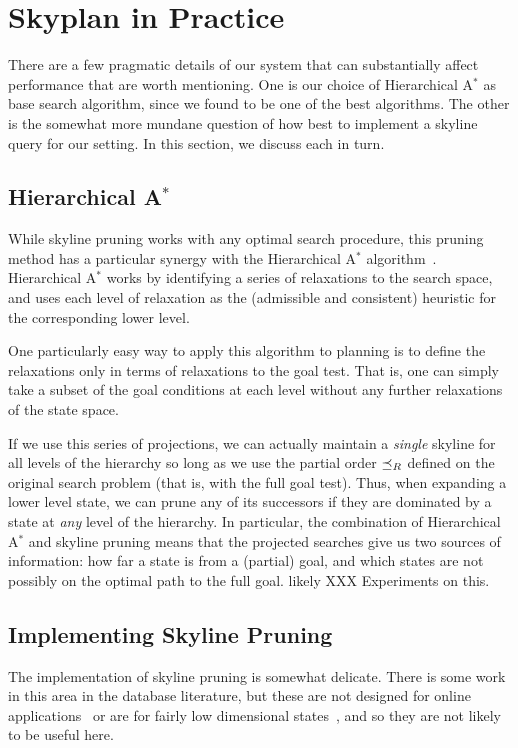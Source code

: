 \documentclass[letterpaper]{article}
\theoremstyle{plain} \newtheorem{theorem}{Theorem} \newtheorem{proposition}{Proposition} \newtheorem{lemma}{Lemma}
\theoremstyle{definition} \newtheorem{definition}{Definition} \newtheorem{conjecture}{Conjecture} \newtheorem*{example}{Example}
\theoremstyle{remark} \newtheorem*{remark}{Remark} \newtheorem*{note}{Note} \newtheorem{case}{Case}
\begin{document}
\section{Skyplan in Practice}

There are a few pragmatic details of our system that can substantially
affect performance that are worth mentioning. One is our choice of
Hierarchical A$^*$ as base search algorithm, since we found to be
one of the best algorithms. The other is the somewhat more mundane
question of how best to implement a skyline query for our setting.
In this section, we discuss each in turn.

\subsection{Hierarchical A$^*$}

While skyline pruning works with any optimal search procedure, this
pruning method has a particular synergy with the Hierarchical A$^*$
algorithm~\cite{holte1996hierarchical}. Hierarchical A$^*$ works
by identifying a series of relaxations to the search space, and
uses each level of relaxation as the (admissible and consistent)
heuristic for the corresponding lower level. 

One particularly easy way to apply this algorithm to planning is
to define the relaxations only in terms of relaxations to the goal
test. That is, one can simply take a subset of the goal conditions
at each level without any further relaxations of the state space. 

If we use this series of projections, we can actually maintain a
\textit{single} skyline for all levels of the hierarchy so long as
we use the partial order $\preceq_R$ defined on the original search problem
(that is, with the full goal test). Thus, when expanding a lower
level state, we can prune any of its successors if they are dominated
by a state at \textit{any} level of the hierarchy.  In particular,
the combination of Hierarchical A$^*$ and skyline pruning means
that the projected searches give us two sources of information: how
far a state is from a (partial) goal, and which states are not
possibly on the optimal path to the full goal. likely XXX Experiments
on this.

\subsection{Implementing Skyline Pruning}

The implementation of skyline pruning is somewhat delicate.  There
is some work in this area in the database literature, but these are
not designed for online applications~\cite{skylineoperator,tan01efficient}
or are for fairly low dimensional states~\cite{KossmannRR02}, and
so they are not likely to be useful here.
\end{document}
